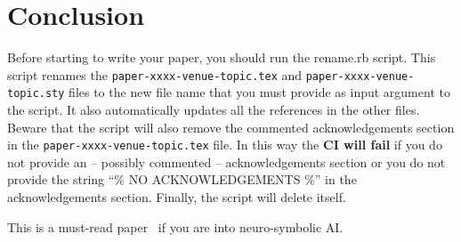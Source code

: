 \documentclass[final,5pt,times,twocolumn]{elsarticle}
\begin{document}
    \section{Conclusion}\label{sec:conclusion}
    Before starting to write your paper, you should run the rename.rb script.
    This script renames the \texttt{paper-xxxx-venue-topic.tex} and \texttt{paper-xxxx-venue-topic.sty} files to the new file name that you must provide as input argument to the script.
    It also automatically updates all the references in the other files.
    Beware that the script will also remove the commented acknowledgements section in the \texttt{paper-xxxx-venue-topic.tex} file.
    In this way the \textbf{CI will fail} if you do not provide an -- possibly commented -- acknowledgements section or you do not provide the string ``\% NO ACKNOWLEDGEMENTS \%'' in the acknowledgements section.
    Finally, the script will delete itself.

    This is a must-read paper~\cite{DBLP:journals/csur/CiattoSAMO24} if you are into neuro-symbolic AI.


    \nocite{*}
    
    

    
\end{document}
